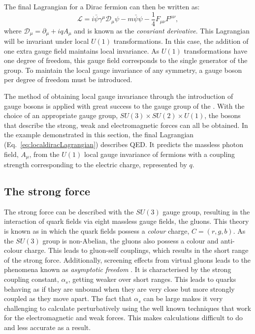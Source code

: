 The final Lagrangian for a Dirac fermion can then be written as:
\begin{equation}
  \label{eq:localdiracLagrangian}
  \mathcal{L}=i\bar{\psi}\gamma^{\mu}\mathcal{D}_{\mu}\psi-m\bar{\psi}\psi-\frac{1}{4}F_{\mu\nu}F^{\mu\nu},
\end{equation}
where $\mathcal{D}_{\mu}=\partial_{\mu}+iqA_{\mu}$ and is known as the
\emph{covariant derivative}. This Lagrangian will be invariant under
local $U(1)$ transformations. In this case, the addition of one extra
gauge field maintains local invariance. As $U(1)$ transformations have
one degree of freedom, this gauge field corresponds to the single
generator of the group.  To maintain the local gauge invariance of
any symmetry, a gauge boson per degree of 
freedom must be introduced.

The method of obtaining local gauge invariance through the
introduction of gauge bosons is applied with great success to the
gauge group of the \SM. With the choice of an appropriate gauge group,
$SU(3)\times SU(2) \times U(1)$, the bosons that describe the strong,
weak and electromagnetic forces can all be obtained. In the example
demonstrated in this section, the final Lagrangian
(Eq.~\ref{eq:localdiracLagrangian}) describes \ac{QED}.
It predicts the massless photon field, $A_{\mu}$, from the $U(1)$
local gauge invariance of fermions with a coupling strength
corresponding to the electric charge, represented by $q$.

\subsection{The strong force}

The strong force can be described with the $SU(3)$ gauge group,
resulting in the interaction of quark fields
via eight massless gauge fields, the gluons. This theory is known as
\QCD in which
the quark fields possess a \emph{colour} charge, $C=(r,g,b)$. As the
$SU(3)$ group is non-Abelian, the gluons also possess a colour and
anti-colour charge. This leads to gluon-self couplings, which
results in the short range of the strong force. Additionally,
screening effects from virtual gluons
leads to the phenomena known as \emph{asymptotic freedom}
\cite{PhysRevLett.30.1343}. It is characterised by the strong
coupling constant, $\alpha_s$, 
getting weaker over short ranges. This leads to quarks behaving as if
they are unbound when they are very close but more strongly coupled as
they move apart. The fact that $\alpha_s$ can be large makes it very
challenging to calculate \QCD perturbatively using the well known
techniques that work for the electromagnetic and weak forces.
This makes \QCD calculations difficult to do and less accurate as a
result.

